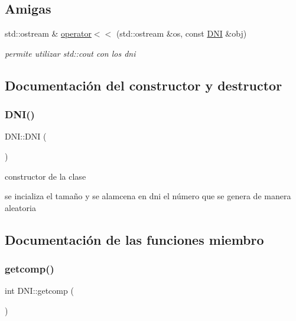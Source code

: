 \subsection*{Amigas}
\begin{DoxyCompactItemize}
\item 
std\+::ostream \& \hyperlink{classDNI_af9c196ae0bace5ca99b1dc9c16a069da}{operator$<$$<$} (std\+::ostream \&os, const \hyperlink{classDNI}{D\+NI} \&obj)
\begin{DoxyCompactList}\small\item\em permite utilizar std\+::cout con los dni \end{DoxyCompactList}\end{DoxyCompactItemize}


\subsection{Documentación del constructor y destructor}
\mbox{\label{classDNI_ad3a35b9da7523fc858a84cf2f78271c2}} 
\subsubsection{\texorpdfstring{D\+N\+I()}{DNI()}}
{\footnotesize\ttfamily D\+N\+I\+::\+D\+NI (\begin{DoxyParamCaption}{ }\end{DoxyParamCaption})}



constructor de la clase 

se incializa el tamaño y se alamcena en dni el número que se genera de manera aleatoria 

\subsection{Documentación de las funciones miembro}
\mbox{\label{classDNI_ad03d2487ed8896fd5a526f8427092931}} 
\subsubsection{\texorpdfstring{getcomp()}{getcomp()}}
{\footnotesize\ttfamily int D\+N\+I\+::getcomp (\begin{DoxyParamCaption}{ }\end{DoxyParamCaption})}



